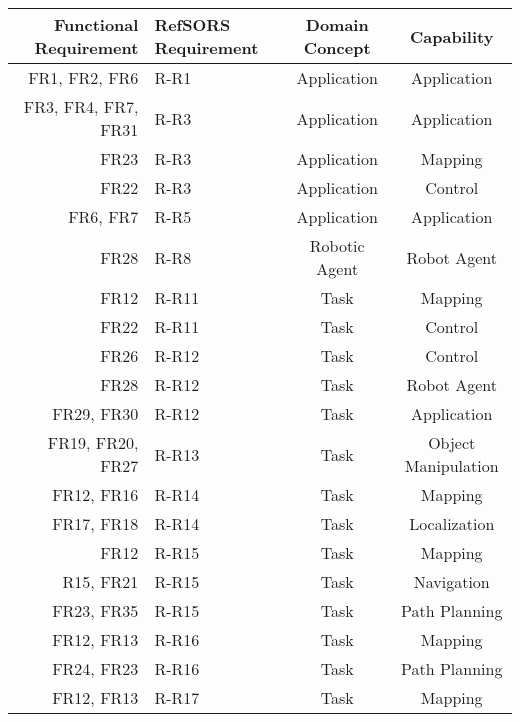 {
\centering
\begin{tabular}{| r | l | c | c |}
	\hline
	Functional Requirement & RefSORS Requirement & Domain Concept & Capability \\ 
	\hline
	FR1, FR2, FR6 & R-R1 	& Application & Application \\
	FR3, FR4, FR7, FR31 	& R-R3 & Application & Application\\
	FR23 					& R-R3 & Application & Mapping\\ %
	FR22 					& R-R3 & Application & Control\\ %
	FR6, FR7 				& R-R5 & Application & Application\\
	\hline
	FR28 					& R-R8 & Robotic Agent & Robot Agent\\
	\hline
	FR12 					& R-R11 & Task & Mapping\\
	FR22 					& R-R11 & Task & Control\\
	FR26				 	& R-R12 & Task & Control\\
	FR28				 	& R-R12 & Task & Robot Agent\\%
	FR29, FR30			 	& R-R12 & Task & Application\\%
	FR19, FR20, FR27		& R-R13 & Task & Object Manipulation\\
	FR12, FR16				& R-R14 & Task & Mapping\\
	FR17, FR18 				& R-R14 & Task & Localization\\
	FR12 					& R-R15 & Task & Mapping\\
	R15, FR21 				& R-R15 & Task & Navigation\\
	FR23, FR35				& R-R15 & Task & Path Planning\\
	FR12, FR13 				& R-R16 & Task & Mapping\\
	FR24, FR23				& R-R16 & Task & Path Planning\\
	FR12, FR13 				& R-R17 & Task & Mapping\\

\end{tabular}}
